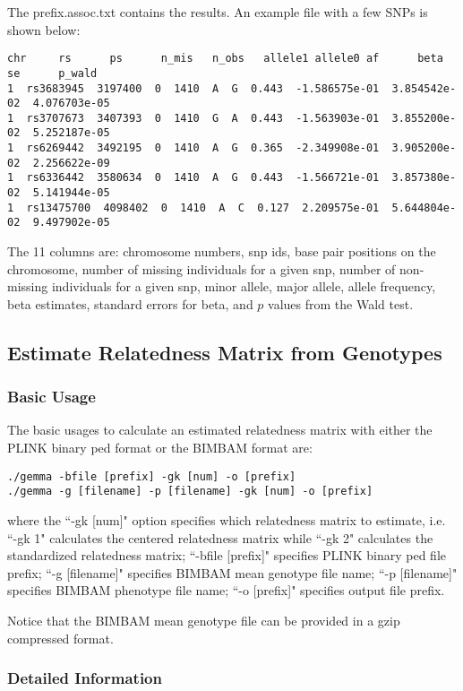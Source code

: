 \documentclass[11pt]{article}
\begin{document}
The prefix.assoc.txt contains the results. An example file with a few
SNPs is shown below:
%
\begin{verbatim}
chr     rs      ps      n_mis   n_obs   allele1 allele0 af      beta    se      p_wald
1  rs3683945  3197400  0  1410  A  G  0.443  -1.586575e-01  3.854542e-02  4.076703e-05
1  rs3707673  3407393  0  1410  G  A  0.443  -1.563903e-01  3.855200e-02  5.252187e-05
1  rs6269442  3492195  0  1410  A  G  0.365  -2.349908e-01  3.905200e-02  2.256622e-09
1  rs6336442  3580634  0  1410  A  G  0.443  -1.566721e-01  3.857380e-02  5.141944e-05
1  rs13475700  4098402  0  1410  A  C  0.127  2.209575e-01  5.644804e-02  9.497902e-05
\end{verbatim}
%

The 11 columns are: chromosome numbers, snp ids, base pair positions on the chromosome, number of missing individuals for a given snp, number of non-missing individuals for a given snp, minor allele, major allele, allele frequency, beta estimates, standard errors for beta, and $p$ values from the Wald test.

\subsection{Estimate Relatedness Matrix from Genotypes}

\subsubsection{Basic Usage}

The basic usages to calculate an estimated relatedness matrix with
either the PLINK binary ped format or the BIMBAM format are:
%
\begin{verbatim}
./gemma -bfile [prefix] -gk [num] -o [prefix]
./gemma -g [filename] -p [filename] -gk [num] -o [prefix]
\end{verbatim}
%
where the ``-gk [num]" option specifies which relatedness matrix to
estimate, i.e. ``-gk 1" calculates the centered relatedness matrix
while ``-gk 2" calculates the standardized relatedness matrix;
``-bfile [prefix]" specifies PLINK binary ped file prefix; ``-g
[filename]" specifies BIMBAM mean genotype file name; ``-p [filename]"
specifies BIMBAM phenotype file name; ``-o [prefix]" specifies output
file prefix.

Notice that the BIMBAM mean genotype file can be provided in a gzip
compressed format.

\subsubsection{Detailed Information}
\end{document}
